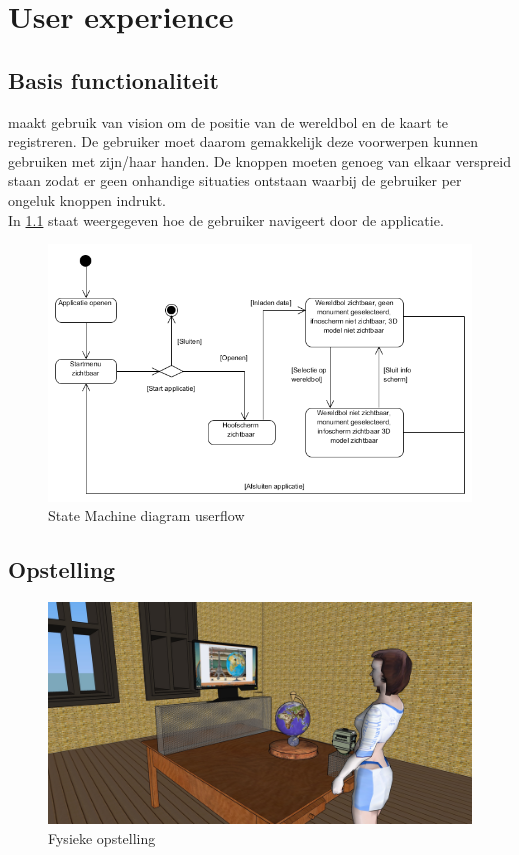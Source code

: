 \chapter{User experience} \label{cha:userexperience}

\section{Basis functionaliteit} \label{sec:basis}
\projectname maakt gebruik van vision om de positie van de wereldbol en de kaart te registreren. De gebruiker moet daarom gemakkelijk deze voorwerpen kunnen gebruiken met zijn/haar handen. De knoppen moeten genoeg van elkaar verspreid staan zodat er geen onhandige situaties ontstaan waarbij de gebruiker per ongeluk knoppen indrukt.\\
In \cref{fig:statemachine1} staat weergegeven hoe de gebruiker navigeert door de applicatie.

\begin{figure}[h]
	\includegraphics[width=130mm]{figs/state_machine1.png}
	\caption{State Machine diagram userflow}
	\label{fig:statemachine1}
\end{figure}


\newpage
\section{Opstelling} \label{sec:setup}
\begin{figure}[h]
	\includegraphics[width=130mm]{figs/screen1.jpg}
	\caption{Fysieke opstelling}
	\label{fig:screen1}
\end{figure}

